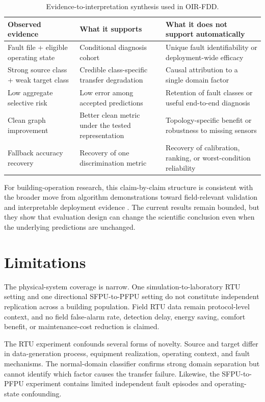 \documentclass[preprint,12pt]{elsarticle}
\begin{document}
\begin{table}[H]
\centering
\caption{Evidence-to-interpretation synthesis used in OIR-FDD.}
\label{tab:synthesis}
\small
\begin{tabularx}{\textwidth}{p{3.0cm}p{4.0cm}X}
\toprule
Observed evidence & What it supports & What it does not support automatically\\
\midrule
Fault file + eligible operating state & Conditional diagnosis cohort & Unique fault identifiability or deployment-wide efficacy\\
Strong source class + weak target class & Credible class-specific transfer degradation & Causal attribution to a single domain factor\\
Low aggregate selective risk & Low error among accepted predictions & Retention of fault classes or useful end-to-end diagnosis\\
Clean graph improvement & Better clean metric under the tested representation & Topology-specific benefit or robustness to missing sensors\\
Fallback accuracy recovery & Recovery of one discrimination metric & Recovery of calibration, ranking, or worst-condition reliability\\
\bottomrule
\end{tabularx}
\end{table}

For building-operation research, this claim-by-claim structure is consistent with the broader move from algorithm demonstrations toward field-relevant validation and interpretable deployment evidence \cite{shi2019review,andersen2024barriers,mosteiro2026dbn}. The current results remain bounded, but they show that evaluation design can change the scientific conclusion even when the underlying predictions are unchanged.

\section{Limitations}
The physical-system coverage is narrow. One simulation-to-laboratory RTU setting and one directional SFPU-to-PFPU setting do not constitute independent replication across a building population. Field RTU data remain protocol-level context, and no field false-alarm rate, detection delay, energy saving, comfort benefit, or maintenance-cost reduction is claimed.

The RTU experiment confounds several forms of novelty. Source and target differ in data-generation process, equipment realization, operating context, and fault mechanisms. The normal-domain classifier confirms strong domain separation but cannot identify which factor causes the transfer failure. Likewise, the SFPU-to-PFPU experiment contains limited independent fault episodes and operating-state confounding.
\end{document}
